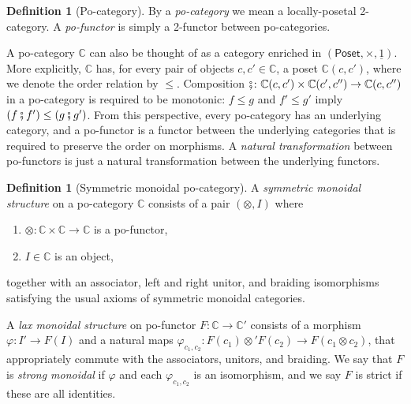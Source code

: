 \documentclass[11pt, oneside, article]{memoir}
\theoremstyle{plain}
\theoremstyle{definition}
\newtheorem{definition}[theorem]{Definition}
\theoremstyle{remark}
\newcommand{\ord}[1]{\underline{#1}}%
\newcommand{\Cat}[1]{{\mathsf{#1}}}%
\newcommand{\poset}{\Cat{Poset}}
\newcommand{\cc}{\mathbb{C}}
\newcommand{\cp}{\mathbin{\fatsemi}}
\begin{document}
\begin{definition}[Po-category]
By a \emph{po-category} we mean a locally-posetal 2-category. A \emph{po-functor} is simply a 2-functor between po-categories.
\end{definition}
A po-category $\cc$ can also be thought of as a category enriched in $(\poset,\times,\ord{1})$. More explicitly, $\cc$ has, for every pair of objects $c,c'\in\cc$, a poset $\cc(c,c')$, where we denote the order relation by $\leq$. Composition $\cp\colon\cc(c,c')\times \cc(c',c'')\to\cc(c,c'')$ in a po-category is required to be monotonic: $f\leq g$ and $f'\leq g'$ imply $(f\cp f')\leq(g\cp g')$. From this perspective, every po-category has an underlying category, and a po-functor is a functor between the underlying categories that is required to preserve the order on morphisms. A \emph{natural transformation} between po-functors is just a natural transformation between the underlying functors.

\begin{definition}[Symmetric monoidal po-category]
A \emph{symmetric monoidal structure} on a po-category $\cc$ consists of a pair $(\otimes,I)$ where
\begin{enumerate}
	\item $\otimes\colon\cc\times\cc\to\cc$ is a po-functor,
	\item $I\in\cc$ is an object,
\end{enumerate}
together with an associator, left and right unitor, and braiding isomorphisms satisfying the usual axioms of symmetric monoidal categories.

A \emph{lax monoidal structure} on po-functor $F\colon\cc\to\cc'$ consists of a morphism  $\varphi\colon I'\to F(I)$ and a natural maps $\varphi_{c_1,c_2}\colon F(c_1)\otimes' F(c_2)\to F(c_1\otimes c_2)$, that appropriately commute with the associators, unitors, and braiding. We say that $F$ is \emph{strong monoidal} if $\varphi$ and each $\varphi_{c_1,c_2}$ is an isomorphism, and we say $F$ is strict if these are all identities.
\end{definition}
\end{document}
